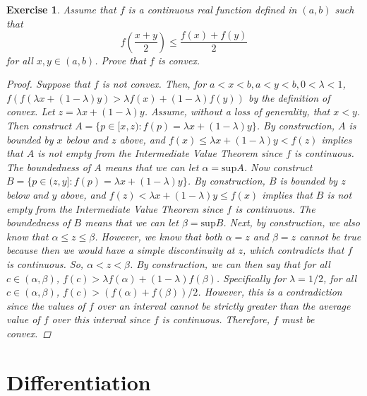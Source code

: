 \documentclass[10pt,letterpaper]{amsart}
\newtheorem{exercise}{Exercise}[section]
\theoremstyle{definition}
\theoremstyle{remark}
\numberwithin{equation}{exercise}
\begin{document}
\begin{multicols}{2}
  \begin{exercise}
    Assume that $f$ is a continuous real function defined in $(a,b)$ such that
    \begin{equation*}
      f\left(\frac{x+y}{2}\right) \le \frac{f(x)+f(y)}{2}
    \end{equation*}
    for all $x,y \in (a,b)$. Prove that $f$ is convex.
    \begin{proof}
      Suppose that $f$ is not convex. Then, for $a < x < b, a < y < b, 0 < \lambda < 1$, $f(f(\lambda x + (1-\lambda)y) > \lambda f(x) + (1-\lambda)f(y))$ by the definition of convex. Let $z = \lambda x + (1-\lambda)y$. Assume, without a loss of generality, that $x < y$. Then construct $A=\{p\in[x,z):f(p) = \lambda x + (1-\lambda)y\}$. By construction, $A$ is bounded by $x$ below and $z$ above, and $f(x) \le \lambda x + (1-\lambda)y < f(z)$ implies that $A$ is not empty from the Intermediate Value Theorem since $f$ is continuous. The boundedness of $A$ means that we can let $\alpha = \mathrm{sup} A$. Now construct $B=\{p\in(z,y]:f(p) = \lambda x + (1-\lambda)y\}$. By construction, $B$ is bounded by $z$ below and $y$ above, and $f(z) < \lambda x + (1-\lambda)y \le f(x)$ implies that $B$ is not empty from the Intermediate Value Theorem since $f$ is continuous. The boundedness of $B$ means that we can let $\beta = \mathrm{sup} B$. Next, by construction, we also know that $\alpha \le z \le \beta$. However, we know that both $\alpha = z$ and $\beta = z$ cannot be true because then we would have a simple discontinuity at $z$, which contradicts that $f$ is continuous. So, $\alpha < z < \beta$. By construction, we can then say that for all $c \in (\alpha,\beta)$, $f(c) > \lambda f(\alpha) + (1-\lambda)f(\beta)$. Specifically for $\lambda = 1/2$, for all $c \in (\alpha,\beta)$, $f(c) > (f(\alpha) + f(\beta))/2$. However, this is a contradiction since the values of $f$ over an interval cannot be strictly greater than the average value of $f$ over this interval since $f$ is continuous. Therefore, $f$ must be convex.
    \end{proof}
  \end{exercise}
  \section{Differentiation}

\end{multicols}
\end{document}
